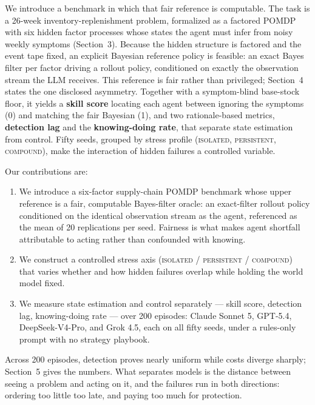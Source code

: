 \documentclass{article}
\begin{document}
We introduce a benchmark in which that fair reference is computable. The task
is a 26-week inventory-replenishment problem, formalized as a factored POMDP
with six hidden factor processes whose states the agent must infer from noisy
weekly symptoms (Section~3). Because the hidden structure is factored and the
event tape fixed, an explicit Bayesian reference policy is feasible:
an exact Bayes filter per factor driving a rollout policy, conditioned on
exactly the observation stream the LLM receives. This reference is fair rather than
privileged; Section~4 states the one disclosed asymmetry. Together with a
symptom-blind base-stock floor, it yields a \textbf{skill score} locating
each agent between ignoring the symptoms (0) and matching the fair Bayesian
(1), and two rationale-based metrics, \textbf{detection lag} and the
\textbf{knowing-doing rate}, that separate state estimation from control.
Fifty seeds, grouped by stress profile (\textsc{isolated},
\textsc{persistent}, \textsc{compound}), make the interaction of hidden
failures a controlled variable.

Our contributions are:
\begin{enumerate}
  \item We introduce a six-factor supply-chain POMDP benchmark whose upper
  reference is a fair, computable Bayes-filter oracle: an exact-filter
  rollout policy conditioned on the identical observation stream as the
  agent, referenced as the mean of 20 replications per seed. Fairness is
  what makes agent shortfall attributable to acting rather than confounded
  with knowing.
  \item We construct a controlled stress axis (\textsc{isolated} /
  \textsc{persistent} / \textsc{compound}) that varies whether and how
  hidden failures overlap while holding the world model fixed.
  \item We measure state estimation and control separately --- skill
  score, detection lag, knowing-doing rate --- over 200 episodes:
  Claude Sonnet 5, GPT-5.4, DeepSeek-V4-Pro, and Grok 4.5, each on all
  fifty seeds, under a rules-only prompt with no strategy playbook.
\end{enumerate}

Across 200 episodes, detection proves nearly uniform while costs diverge
sharply; Section~5 gives the numbers. What separates models is the
distance between seeing a problem and acting on it, and the failures run
in both directions: ordering too little too late, and paying too much for
protection.
\end{document}
